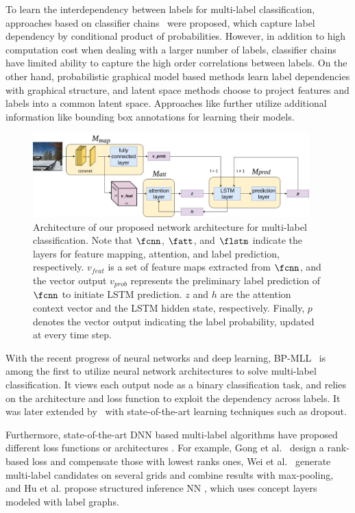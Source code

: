 \documentclass[letterpaper]{article} %
\begin{document}
To learn the interdependency between labels for multi-label classification, approaches based on classifier chains~\cite{read2011classifier} were proposed, which capture label dependency by conditional product of probabilities. However, in addition to high computation cost when dealing with a larger number of labels, classifier chains have limited ability to capture the high order correlations between labels. On the other hand, probabilistic graphical model based methods  \cite{li2014multi,li2016conditional} learn label dependencies with graphical structure, and latent space methods \cite{yeh2017learning,bhatia2015sparse} choose to project features and labels into a common latent space. Approaches like \cite{yang2016exploit} further utilize additional information like bounding box annotations for learning their models.

\begin{figure}[t!]
	\centering
	\includegraphics[width=0.95\textwidth]{./AAAI.png}
	\caption{Architecture of our proposed network architecture for multi-label classification. Note that $\fcnn$, $\fatt$, and $\flstm$ indicate the layers for feature mapping, attention, and label prediction, respectively. $v_{feat}$ is a set of feature maps extracted from $\fcnn$, and the vector output $v_{prob}$ represents the preliminary label prediction of $\fcnn$ to initiate LSTM prediction. $z$ and $h$ are the attention context vector and the LSTM hidden state, respectively. Finally, $p$ denotes the vector output indicating the label probability, updated at every time step.}
	\label{fig:2}
\end{figure}

With the recent progress of neural networks and deep learning, BP-MLL~\cite{zhang2006multilabel} is among the first to utilize neural network architectures to solve multi-label classification. It views each output node as a binary classification task, and relies on the architecture and loss function to exploit the dependency across labels. It was later extended by~\cite{nam2014large} with state-of-the-art learning techniques such as dropout.

Furthermore, state-of-the-art DNN based multi-label algorithms have proposed different loss functions or architectures \cite{gong2013deep,wei2014cnn,hu2016learning}. For example, Gong et al.~\cite{gong2013deep} design a rank-based loss and compensate those with lowest ranks ones, Wei et al.~\cite{wei2014cnn} generate multi-label candidates on several grids and combine results with max-pooling, and Hu et al. propose structured inference NN \cite{hu2016learning}, which uses concept layers modeled with label graphs.
\end{document}
